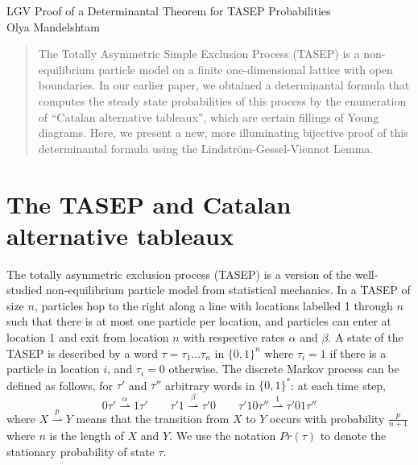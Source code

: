 \documentclass[11pt]{article}
\numberwithin{equation}{section}
\theoremstyle{plain}
\theoremstyle{definition}
\theoremstyle{remark}
\begin{document}
\begin{center} {\Large{\sc LGV Proof of a Determinantal Theorem for TASEP Probabilities}} \\
\vspace{0.1in}
Olya Mandelshtam
 \end{center}

\begin{abstract}
The Totally Asymmetric Simple Exclusion Process (TASEP) is a non-equilibrium particle model on a finite one-dimensional lattice with open boundaries. In our earlier paper, we obtained a determinantal formula that computes the steady state probabilities of this process by the enumeration of ``Catalan alternative tableaux'', which are certain fillings of Young diagrams. Here, we present a new, more illuminating bijective proof of this determinantal formula using the Lindstr\"{o}m-Gessel-Viennot Lemma.
\end{abstract}

\section{The TASEP and Catalan alternative tableaux}


The totally asymmetric exclusion process (TASEP) is a version of the well-studied non-equilibrium particle model from statistical mechanics. In a TASEP of size $n$, particles hop to the right along a line with locations labelled 1 through $n$ such that there is at most one particle per location, and particles can enter at location 1 and exit from location $n$ with respective rates $\alpha$ and $\beta$. A state of the TASEP is described by a word $\tau = \tau_1\ldots\tau_n$ in $\{0,1\}^n$ where $\tau_i=1$ if there is a particle in location $i$, and $\tau_i=0$ otherwise. The discrete Markov process can be defined as follows, for $\tau'$ and $\tau''$ arbitrary words in $\{0,1\}^{\ast}$: at each time step, 
\[
0\tau'  \overset{\alpha}{\rightharpoonup} 1\tau' \qquad \tau'1  \overset{\beta}{\rightharpoonup} \tau'0 \qquad \tau'10\tau''  \overset{1}{\rightharpoonup} \tau'01\tau''
\]
where $X  \overset{p}{\rightharpoonup} Y$ means that the transition from $X$ to $Y$ occurs with probability $\frac{p}{n+1}$ where $n$ is the length of $X$ and $Y$. We use the notation $Pr(\tau)$ to denote the stationary probability of state $\tau$.
\end{document}
